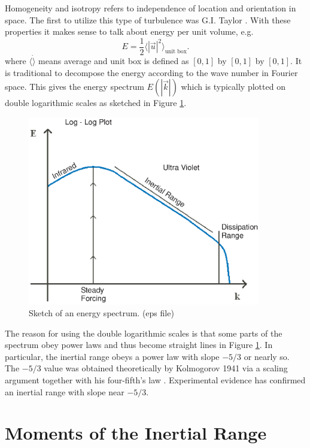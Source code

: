 Homogeneity and isotropy refers to independence of location and orientation in space. The first to utilize this type of turbulence was G.I. Taylor \cite{Taylor1935}. With these properties it makes sense to talk about energy per unit volume, e.g.
\begin{equation}
    E = \frac{1}{2}\langle |\vec{u}|^2 \rangle_{\mbox{unit box}}.
\end{equation}
where $\langle \dot \rangle$ means average and unit box is defined as $[0,1]$ by $[0,1]$ by $[0,1]$.
It is traditional to decompose the energy according to the wave number in Fourier space.  This gives the energy spectrum $E(|\vec{k}|)$ which is typically plotted on double logarithmic scales as sketched in Figure \ref{fig: intro energy spectrum}.
\begin{figure}[!htp]
    \begin{center}
   \includegraphics[width=4in]{intro_energyspectrum.eps}
   \end{center}
  \caption{Sketch of an energy spectrum. (eps file)} \label{fig: intro energy spectrum}
\end{figure}
The reason for using the double logarithmic scales is that some parts of the spectrum obey power laws and thus become straight lines in Figure \ref{fig: intro energy spectrum}.  In particular, the inertial range obeys a power law with slope $-5/3$ or nearly so.  The $-5/3$ value was obtained theoretically by Kolmogorov 1941 via a scaling argument together with his four-fifth's law \cite{Kolmogorov}.  Experimental evidence \cite{Frisch, Grant, Champagne} has confirmed an inertial range with slope near $-5/3$.

\section{Moments of the Inertial Range}

